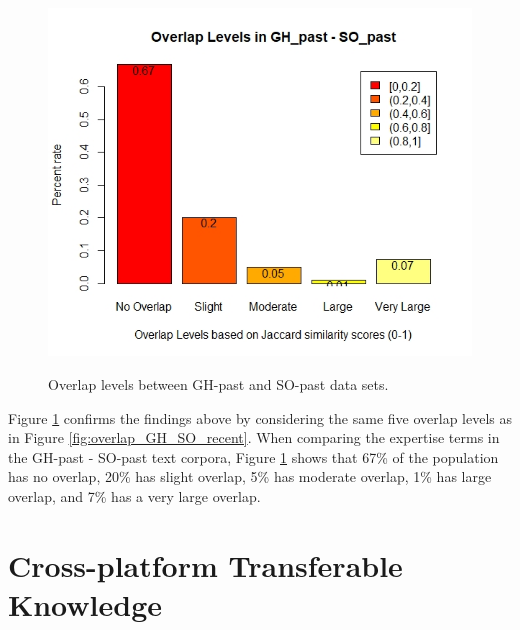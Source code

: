         \begin{figure}
          \centering
          \includegraphics[width=\textwidth]{figures/overlap_SO_GH_past.jpeg}\\
          \caption{Overlap levels between GH-past and SO-past data sets.}
          \label{fig:overlap_GH_SO_past}
        \end{figure}
        
        Figure \ref{fig:overlap_GH_SO_past} confirms the findings above by considering the same five overlap levels as in Figure \ref{fig:overlap_GH_SO_recent}. When comparing the expertise terms in the GH-past - SO-past text corpora, Figure \ref{fig:overlap_GH_SO_past} shows that 67\% of the population has no overlap, 20\% has slight overlap, 5\% has moderate overlap, 1\% has large overlap, and 7\% has a very large overlap. \\
        
    
    \section{Cross-platform Transferable Knowledge\label{sec:results_rq3}}
        

